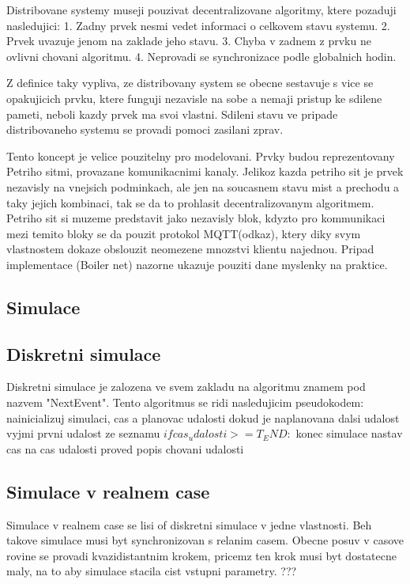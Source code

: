 Distribovane systemy museji pouzivat decentralizovane algoritmy, ktere pozaduji nasledujici: 1. Zadny prvek nesmi vedet informaci o celkovem stavu systemu. 2. Prvek uvazuje jenom na zaklade jeho stavu. 3. Chyba v zadnem z prvku ne ovlivni chovani algoritmu. 4. Neprovadi se synchronizace podle globalnich hodin. 

Z definice taky vypliva, ze distribovany system se obecne sestavuje s vice se opakujicich prvku, ktere funguji nezavisle na sobe a nemaji pristup ke sdilene pameti, neboli kazdy prvek ma svoi vlastni. Sdileni stavu ve pripade distribovaneho systemu se provadi pomoci zasilani zprav.

Tento koncept je velice pouzitelny pro modelovani. Prvky budou reprezentovany Petriho sitmi, provazane komunikacnimi kanaly. Jelikoz kazda petriho sit je prvek nezavisly na vnejsich podminkach, ale jen na soucasnem stavu mist a prechodu a taky jejich kombinaci, tak se da to prohlasit decentralizovanym algoritmem. Petriho sit si muzeme predstavit jako nezavisly blok, kdyzto pro kommunikaci mezi temito bloky se da pouzit protokol MQTT(odkaz), ktery diky svym vlastnostem dokaze obslouzit neomezene mnozstvi klientu najednou. Pripad implementace (Boiler net) nazorne ukazuje pouziti dane myslenky na praktice.
\subsection*{Simulace}
\subsection*{Diskretni simulace}
Diskretni simulace je zalozena ve svem zakladu na algoritmu znamem pod nazvem "NextEvent". Tento algoritmus se ridi nasledujicim pseudokodem:
nainicializuj simulaci, cas a planovac udalosti
dokud je naplanovana dalsi udalost
  vyjmi prvni udalost ze seznamu
  $if cas_udalosti >= T_END:$
    konec simulace
  nastav cas na cas udalosti
  proved popis chovani udalosti
\subsection*{Simulace v realnem case}
Simulace v realnem case se lisi of diskretni simulace v jedne vlastnosti. Beh takove simulace musi byt synchronizovan s relanim casem. Obecne posuv v casove rovine se provadi kvazidistantnim krokem, pricemz ten krok musi byt dostatecne maly, na to aby simulace stacila cist vstupni parametry. ??? %

